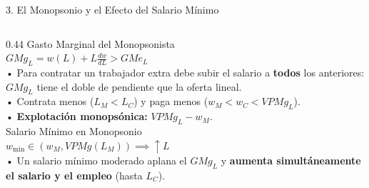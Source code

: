 \documentclass[aspectratio=169, 10pt]{beamer}
\begin{document}
\begin{frame}{3. El Monopsonio y el Efecto del Salario Mínimo}
\begin{columns}[T]
    \begin{column}{0.44\textwidth}
      {\scriptsize\color{grisTexto}Gasto Marginal del Monopsonista}\\[1pt]
      {\normalsize\color{rojoAcento}\textbf{\(GMg_L = w(L) + L \frac{dw}{dL} > GMe_L\)}}\\[4pt]
      {\scriptsize
        • Para contratar un trabajador extra debe subir el salario a \textbf{todos} los anteriores: \(GMg_L\) tiene el doble de pendiente que la oferta lineal.\\
        • Contrata menos (\(L_M < L_C\)) y paga menos (\(w_M < w_C < VPMg_L\)).\\
        • \textbf{Explotación monopsónica:} \(VPMg_L - w_M\).\\[4pt]
      }
      {\scriptsize\color{grisTexto}Salario Mínimo en Monopsonio}\\[1pt]
      {\normalsize\color{verdeAcento}\textbf{\(w_{\min} \in (w_M, VPMg(L_M)) \implies \uparrow L\)}}\\[4pt]
      {\scriptsize
        • Un salario mínimo moderado aplana el \(GMg_L\) y \textbf{aumenta simultáneamente el salario y el empleo} (hasta \(L_C\)).
      }
    \end{column}
  \end{columns}

\end{frame}
\end{document}

